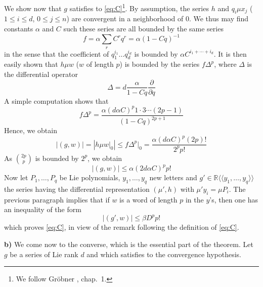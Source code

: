 \documentclass[a4paper,12pt]{article}
\newcommand{\R}{\mathbb{R}}
\begin{document}
We show now that $g$ satisfies to \eqref{eq:C}\footnote{We follow Gröbner \cite{6}, chap.\ 1.}. By assumption, the series $h$ and $q_i \mu x_j$ ($1 \leq i \leq d$, $0 \leq j \leq n$) are convergent in a neighborhood of $0$. We thus may find constants $\alpha$ and $C$ such these series are all bounded by the same series
\begin{equation*}
	f=\alpha \sum_r C^r q^r=\alpha(1-C q)^{-1}
\end{equation*}
in the sense that the coefficient of $q_1^{i_1} \ldots q_d^{i_d}$ is bounded by $\alpha C^{i_1 + \dotsb + i_d}$.
It is then easily shown that $h\mu w$ ($w$ of length $p$) is bounded by the series $f \Delta^p$, where $\Delta$ is the differential operator
\begin{equation*}
	\Delta={d} \frac{\alpha}{1-{Cq}} \frac{\partial}{\partial {q}}
\end{equation*}
A simple computation shows that
\begin{equation*}
	f \Delta^p=\frac{\alpha(d \alpha C)^p 1 \cdot 3 \dotsb (2 p-1)}{(1-C q)^{2 p+1}}
\end{equation*}
Hence, we obtain
\begin{equation*}
	|(g, w)|=\left|h \mu w \rvert_0\right| \leq f \Delta^p\rvert_0
	=\frac{\alpha(d \alpha C)^p(2 p) !}{2^p p !}
\end{equation*}
As ${2p}\choose{p}$ is bounded by $2^{{p}}$, we obtain
\begin{equation*}
	|(g, w)| \leq \alpha(2 d\alpha {C})^{{p}} {p}!
\end{equation*}
Now let ${P}_1, \ldots, P_q$ be Lie polynomials, ${y}_1, \ldots, {y}_{{q}}$ new letters and $g' \in \R\langle\langle{y}_1, \ldots, {y}_{{q}}\rangle\rangle$ the series having the differential representation $(\mu',h)$ with $\mu' {y}_i=\mu {P}_i$. The previous paragraph implies that if $w$ is a word of length ${p}$ in the $y$'s, then one has an inequality of the form
\begin{equation*}
	\left|(g', w)\right| \leq \beta D^p p !
\end{equation*}
which proves \eqref{eq:C}, in view of the remark following the definition of \eqref{eq:C}.

\bigskip

\textbf{b)} We come now to the converse, which is the essential part of the theorem. Let $g$ be a series of Lie rank $d$ and which satisfies to the convergence hypothesis.
\end{document}
